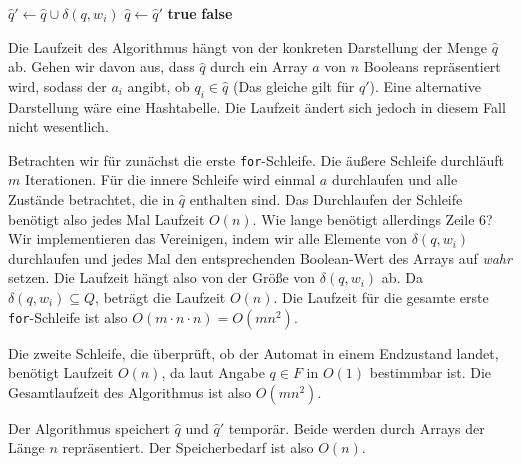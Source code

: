 \documentclass[11pt,a4paper]{article}
\begin{document}
{{\begin{loesung}
\begin{enumerate}
\begin{algorithmic}[1]
                        \State $\hat{q}' \gets \hat{q} \cup \delta(q, w_i)$
                    \EndFor
                    \State $\hat{q} \gets \hat{q}'$
                \EndFor
                        \State \Return \textbf{true}
                    \EndIf
                \EndFor
                \State \Return \textbf{false}
            \EndProcedure
        \end{algorithmic}
        Die Laufzeit des Algorithmus hängt von der konkreten Darstellung der Menge $\hat{q}$ ab.
        Gehen wir davon aus, dass $\hat{q}$ durch ein Array $a$ von $n$ Booleans repräsentiert wird, sodass der $a_i$ angibt, ob $q_i \in \hat{q}$ (Das gleiche gilt für $\hat{q}'$).
        Eine alternative Darstellung wäre eine Hashtabelle. Die Laufzeit ändert sich jedoch in diesem Fall nicht wesentlich.

        Betrachten wir für zunächst die erste \texttt{for}-Schleife.
        Die äußere Schleife durchläuft $m$ Iterationen.
        Für die innere Schleife wird einmal $a$ durchlaufen und alle Zustände betrachtet, die in $\hat{q}$ enthalten sind.
        Das Durchlaufen der Schleife benötigt also jedes Mal Laufzeit $O(n)$.
        Wie lange benötigt allerdings Zeile 6?
        Wir implementieren das Vereinigen, indem wir alle Elemente von $\delta(q, w_i)$ durchlaufen und jedes Mal den entsprechenden Boolean-Wert des Arrays auf \emph{wahr} setzen.
        Die Laufzeit hängt also von der Größe von $\delta(q, w_i)$ ab.
        Da $\delta(q, w_i) \subseteq Q$, beträgt die Laufzeit $O(n)$.
        Die Laufzeit für die gesamte erste \texttt{for}-Schleife ist also $O(m \cdot n \cdot n) = O(m n^2)$.

        Die zweite Schleife, die überprüft, ob der Automat in einem Endzustand landet, benötigt Laufzeit $O(n)$, da laut Angabe $q \in F$ in $O(1)$ bestimmbar ist.
        Die Gesamtlaufzeit des Algorithmus ist also $O(mn^2)$.

        Der Algorithmus speichert $\hat{q}$ und $\hat{q}'$ temporär.
        Beide werden durch Arrays der Länge $n$ repräsentiert.
        Der Speicherbedarf ist also $O(n)$.
    \end{enumerate}
\end{loesung}
}}
\end{document}
